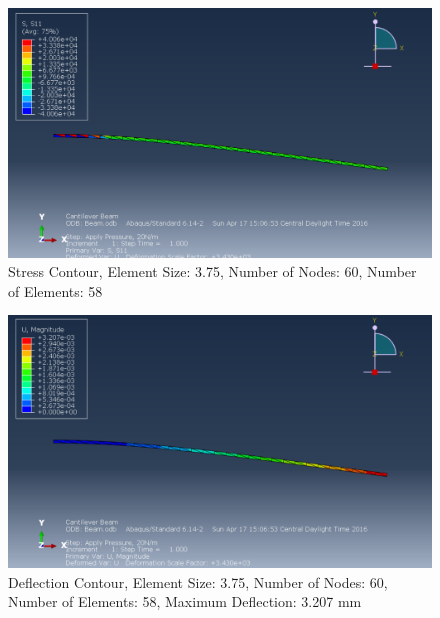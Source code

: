 \documentclass[a4paper]{article}
\begin{document}
\begin{figure}[ht]
\centering
\includegraphics[scale=.50]{3Nsize3_75Stress.PNG}
\caption{Stress Contour, Element Size: 3.75, Number of Nodes: 60, Number of Elements: 58}
\end{figure}
\begin{figure}[ht]
\centering
\includegraphics[scale=.50]{3Nsize3_75MDisplacement.PNG}
\caption{Deflection Contour, Element Size: 3.75, Number of Nodes: 60, Number of Elements: 58, Maximum Deflection: 3.207 mm}
\end{figure}
\end{document}
